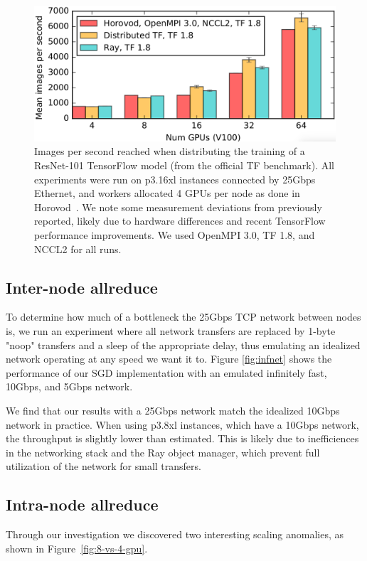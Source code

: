 \begin{figure}[tb]
    \centering
    \includegraphics[width=5.1in,keepaspectratio]{fig/sgd.png}
    \caption{
    \small{
        Images per second reached when distributing the training of a
        ResNet-101 TensorFlow model (from the official TF benchmark).
        All experiments were run on p3.16xl instances connected by 25Gbps Ethernet, and
        workers allocated 4 GPUs per node as done in Horovod~\cite{horovod}.
        We note some measurement deviations from previously reported, likely
        due to hardware differences and
        recent TensorFlow performance improvements. We used
        OpenMPI 3.0, TF 1.8, and NCCL2 for all runs.
    }
    }
    \label{fig:sgd}
\end{figure}

\subsection{Inter-node allreduce}
To determine how much of a bottleneck the 25Gbps TCP network between nodes is, we run an experiment where all network transfers are replaced by 1-byte "noop" transfers and a sleep of the appropriate delay, thus emulating an idealized network operating at any speed we want it to. Figure \ref{fig:infnet} shows the performance of our SGD implementation with an emulated infinitely fast, 10Gbps, and 5Gbps network.

We find that our results with a 25Gbps network match the idealized 10Gbps network in practice. When using p3.8xl instances, which have a 10Gbps network, the throughput is slightly lower than estimated. This is likely due to inefficiences in the networking stack and the Ray object manager, which prevent full utilization of the network for small transfers.

\subsection{Intra-node allreduce}
Through our investigation we discovered two interesting scaling anomalies, as
shown in Figure~\ref{fig:8-vs-4-gpu}.

